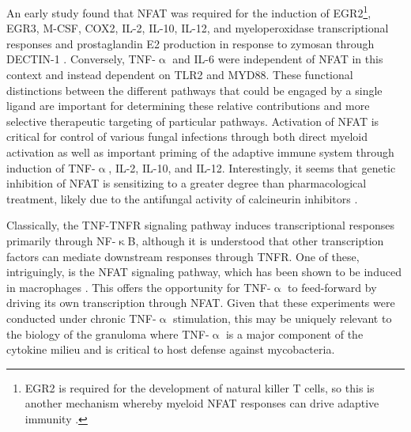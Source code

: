 An early study found that NFAT was required for the induction of EGR2\footnote{EGR2 is required for the development of natural killer T cells, so this is another mechanism whereby myeloid NFAT responses can drive adaptive immunity \citep{Lazarevic2009}.}, EGR3, M\hyp{}CSF, COX2, IL\hyp{}2, IL\hyp{}10, IL\hyp{}12, and myeloperoxidase transcriptional responses and prostaglandin E2 production in response to zymosan through DECTIN\hyp{}1 \citep{Goodridge2007}. Conversely, TNF\hyp{}$\upalpha$ and IL\hyp{}6 were independent of NFAT in this context and instead dependent on TLR2 and MYD88. These functional distinctions between the different pathways that could be engaged by a single ligand are important for determining these relative contributions and more selective therapeutic targeting of particular pathways. Activation of NFAT is critical for control of various fungal infections through both direct myeloid activation as well as important priming of the adaptive immune system through induction of TNF\hyp{}$\upalpha$, IL\hyp{}2, IL\hyp{}10, and IL\hyp{}12. Interestingly, it seems that genetic inhibition of NFAT is sensitizing to a greater degree than pharmacological treatment, likely due to the antifungal activity of calcineurin inhibitors \citep{Herbst2015, Xu2009, Zelante2017, Sugita2005}.

Classically, the TNF\hyp{}TNFR signaling pathway induces transcriptional responses primarily through NF\hyp{}$\upkappa$B, although it is understood that other transcription factors can mediate downstream responses through TNFR. One of these, intriguingly, is the NFAT signaling pathway, which has been shown to be induced in macrophages \citep{Yarilina2011}. This offers the opportunity for TNF\hyp{}$\upalpha$ to feed\hyp{}forward by driving its own transcription through NFAT. Given that these experiments were conducted under chronic TNF\hyp{}$\upalpha$ stimulation, this may be uniquely relevant to the biology of the granuloma where TNF\hyp{}$\upalpha$ is a major component of the cytokine milieu and is critical to host defense against mycobacteria.

